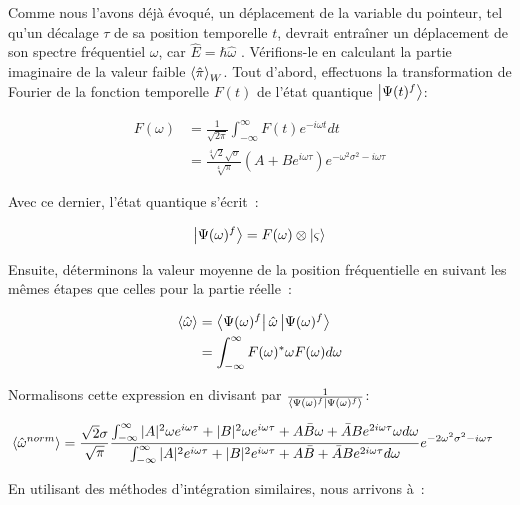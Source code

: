 \begin{onehalfspace}
    Comme nous l'avons déjà évoqué, un déplacement de la variable du 
    pointeur, tel qu'un décalage $\tau$ de sa position temporelle $t$, 
    devrait entraîner un déplacement de son spectre fréquentiel $\omega$, 
    car $\hat{E} = \hbar\hat{\omega}$ \cite{Peebles,Griffiths}. 
    Vérifions-le en calculant la partie imaginaire de la valeur faible 
    $\expval{\hat{\pi}}_W$. Tout d’abord, effectuons la transformation de 
    Fourier de la fonction temporelle $F(t)$ de l'état quantique 
    $\ket{\Psi(t)^f}$:

    \begin{align}
        F(\omega) &= \frac{1}{\sqrt{2\pi}}\int_{-\infty}^{\infty} F(t)e^{-i\omega t}dt\\
        &= \frac{\sqrt[4]{2}\sqrt{\sigma}}{\sqrt[4]{\pi}}(A + Be^{i\omega\tau})e^{-\omega^2 \sigma^2 - i\omega\tau}
    \end{align}

    \noindent Avec ce dernier, l’état quantique s’écrit :

    \begin{equation}
        \ket{\Psi(\omega)^f} = F(\omega) \otimes \ket{\varsigma}
    \end{equation}

    \noindent Ensuite, déterminons la valeur moyenne de la position 
    fréquentielle en suivant les mêmes étapes que celles 
    pour la partie réelle :
    
    \begin{align}
        \expval{\hat{\omega}} &= \bra{\Psi(\omega)^f}\hat{\omega}\ket{\Psi(\omega)^f}\\
        &= \int_{-\infty}^{\infty} F(\omega)^* \omega F(\omega) d\omega
    \end{align}

    \noindent Normalisons cette expression en divisant par 
    $\frac{1}{\bra{\Psi(\omega)^f}\ket{\Psi(\omega)^f}}$:

    \begin{align}
        \expval{\hat{\omega}^{norm}} &= \frac{\sqrt{2}\sigma}{\sqrt{\pi}}\frac{\int_{-\infty}^{\infty} |A|^2\omega e^{i\omega\tau} + |B|^2\omega e^{i\omega\tau} + A\bar{B}\omega + \bar{A}Be^{2i\omega\tau} \omega d\omega}{\int_{-\infty}^{\infty} |A|^2 e^{i\omega\tau} + |B|^2 e^{i\omega\tau} + A\bar{B} + \bar{A}Be^{2i\omega\tau}d\omega}e^{-2\omega^2 \sigma^2 -i\omega\tau}
    \end{align}

    \noindent En utilisant des méthodes d’intégration similaires, nous 
    arrivons à :


\end{onehalfspace}
